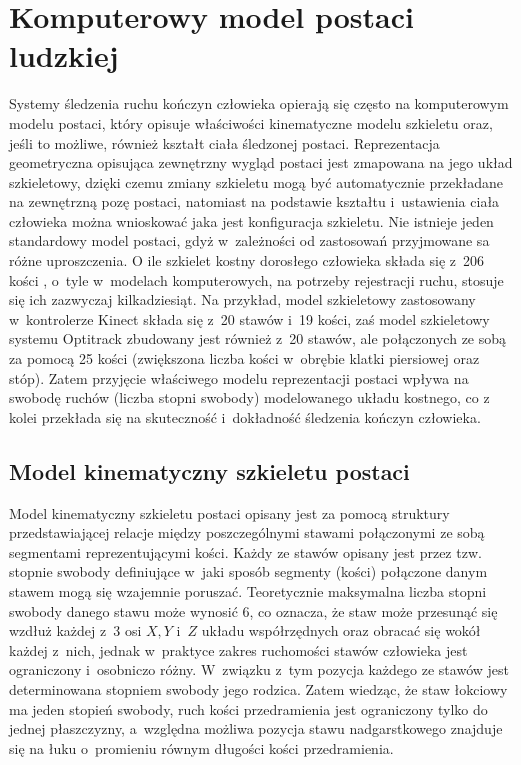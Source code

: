 \section{Komputerowy model postaci ludzkiej} \label{chap:bodyRep}
Systemy śledzenia ruchu kończyn człowieka opierają się często na komputerowym modelu postaci, który opisuje właściwości kinematyczne modelu szkieletu oraz, jeśli to możliwe, również kształt ciała śledzonej postaci. Reprezentacja geometryczna opisująca zewnętrzny wygląd postaci jest zmapowana na jego układ szkieletowy, dzięki czemu zmiany szkieletu mogą być automatycznie przekładane na zewnętrzną pozę postaci, natomiast na podstawie kształtu i~ustawienia ciała człowieka można wnioskować jaka jest konfiguracja szkieletu. 
Nie istnieje jeden standardowy model postaci, gdyż w~zależności od zastosowań przyjmowane sa różne uproszczenia. O ile szkielet kostny dorosłego człowieka składa się z~206 kości \cite{Lasinski1990}, o~tyle w~modelach komputerowych, na potrzeby rejestracji ruchu, stosuje się ich zazwyczaj kilkadziesiąt. Na przykład, model szkieletowy zastosowany w~kontrolerze Kinect składa się z~20 stawów i~19 kości, zaś model szkieletowy systemu Optitrack zbudowany jest również z~20 stawów, ale połączonych ze sobą za pomocą 25 kości (zwiększona liczba kości w~obrębie klatki piersiowej oraz stóp). Zatem przyjęcie właściwego modelu reprezentacji postaci wpływa na swobodę ruchów (liczba stopni swobody) modelowanego układu kostnego, co z kolei przekłada się na skuteczność i~dokładność śledzenia kończyn człowieka.
											
\subsection{Model kinematyczny szkieletu postaci}
Model kinematyczny szkieletu postaci opisany jest za pomocą struktury przedstawiającej relacje między poszczególnymi stawami połączonymi ze sobą segmentami reprezentującymi kości. Każdy ze stawów opisany jest przez tzw. stopnie swobody definiujące w~jaki sposób segmenty (kości) połączone danym stawem mogą się wzajemnie poruszać. Teoretycznie maksymalna liczba stopni swobody danego stawu może wynosić 6, co oznacza, że staw może przesunąć się wzdłuż każdej z~3 osi $X, Y$ i~$Z$ układu współrzędnych oraz obracać się wokół każdej z~nich, jednak w~praktyce zakres ruchomości stawów człowieka jest ograniczony i~osobniczo różny. W~związku z~tym pozycja każdego ze stawów jest determinowana stopniem swobody jego rodzica. Zatem wiedząc, że staw łokciowy ma jeden stopień swobody, ruch kości przedramienia jest ograniczony tylko do jednej płaszczyzny, a~względna możliwa pozycja stawu nadgarstkowego znajduje się na łuku o~promieniu równym długości kości przedramienia.

